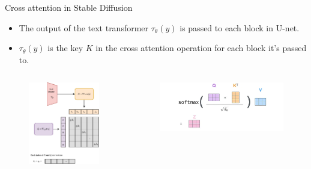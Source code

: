 \documentclass[8pt]{beamer}
\begin{document}
\begin{frame}{Cross attention in Stable Diffusion}
   \begin{itemize}
       \item The output of the text transformer $\tau_{\theta}(y)$ is passed to each block in U-net.
       \item $\tau_{\theta}(y)$ is the key $K$ in the cross attention operation for each block it's passed to.
   \end{itemize}

   \begin{columns}
      \begin{column}{0.5\textwidth}
         \begin{figure}
            \includegraphics[scale=0.25]{images/sd_cross_attention_light}
            \label{fig:diffusion_process_diagram}
         \end{figure}
      \end{column}
      \begin{column}{0.5\textwidth}
        \begin{minipage}{\textwidth}
             \begin{figure}
                \includegraphics[scale=0.20]{images/qkv}

\end{figure}
\end{minipage}
\end{column}
\end{columns}
\end{frame}
\end{document}

